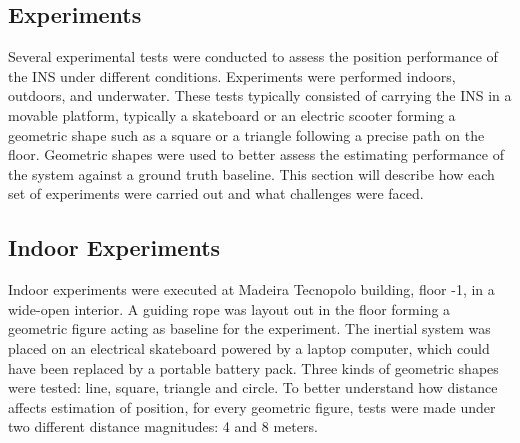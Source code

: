 \newpage




\subsection{Experiments}

Several experimental tests were conducted to assess the position performance of the INS under different conditions. Experiments were performed indoors, outdoors, and underwater. These tests typically consisted of carrying the INS in a movable platform, typically a skateboard or an electric scooter forming a geometric shape such as a square or a triangle following a precise path on the floor. Geometric shapes were used to better assess the estimating performance of the system against a ground truth baseline. This section will describe how each set of experiments were carried out and what challenges were faced.

\subsection{Indoor Experiments}

Indoor experiments were executed at Madeira Tecnopolo building, floor -1, in a wide-open interior. A guiding rope was layout out in the floor forming a geometric figure acting as baseline for the experiment. The inertial system was placed on an electrical skateboard powered by a laptop computer, which could have been replaced by a portable battery pack. Three kinds of geometric shapes were tested: line, square, triangle and circle. To better understand how distance affects estimation of position, for every geometric figure, tests were made under two different distance magnitudes: 4 and 8 meters.

